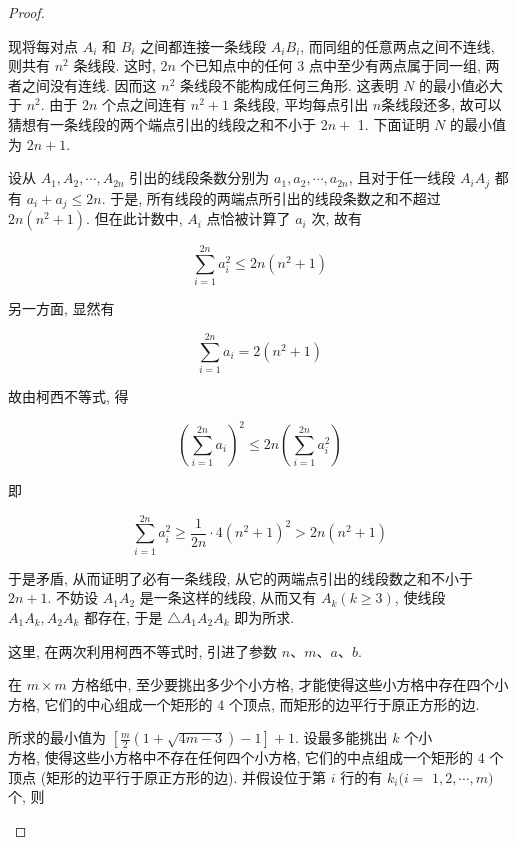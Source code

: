 \begin{proof}
\begin{example}
\begin{solution}
\begin{note}
\begin{solution}
	现将每对点 $A_{i}$ 和 $B_{i}$ 之间都连接一条线段 $A_{i} B_{i}$, 而同组的任意两点之间不连线, 则共有 $n^{2}$ 条线段. 这时, $2 n$ 个已知点中的任何 3 点中至少有两点属于同一组, 两者之间没有连线. 因而这 $n^{2}$ 条线段不能构成任何三角形. 这表明 $N$ 的最小值必大于 $n^{2}$. 由于 $2 n$ 个点之间连有 $n^{2}+1$ 条线段, 平均每点引出 $n$条线段还多, 故可以猜想有一条线段的两个端点引出的线段之和不小于 $2 n+$ 1. 下面证明 $N$ 的最小值为 $2 n+1$.
	
	设从 $A_{1}, A_{2}, \cdots, A_{2 n}$ 引出的线段条数分别为 $a_{1}, a_{2}, \cdots, a_{2 n}$, 且对于任一线段 $A_{i} A_{j}$ 都有 $a_{i}+a_{j} \leqslant 2 n$. 于是, 所有线段的两端点所引出的线段条数之和不超过 $2 n\left(n^{2}+1\right)$. 但在此计数中, $A_{i}$ 点恰被计算了 $a_{i}$ 次, 故有
	
	$$
	\sum_{i=1}^{2 n} a_{i}^{2} \leqslant 2 n\left(n^{2}+1\right)
	$$
	
	另一方面, 显然有
	
	$$
	\sum_{i=1}^{2 n} a_{i}=2\left(n^{2}+1\right)
	$$
	
	故由柯西不等式, 得
	
	$$
	\left(\sum_{i=1}^{2 n} a_{i}\right)^{2} \leqslant 2 n\left(\sum_{i=1}^{2 n} a_{i}^{2}\right)
	$$
	
	即
	
	$$
	\sum_{i=1}^{2 n} a_{i}^{2} \geqslant \frac{1}{2 n} \cdot 4\left(n^{2}+1\right)^{2}>2 n\left(n^{2}+1\right)
	$$
	
	于是矛盾, 从而证明了必有一条线段, 从它的两端点引出的线段数之和不小于 $2 n+1$. 不妨设 $A_{1} A_{2}$ 是一条这样的线段, 从而又有 $A_{k}(k \geqslant 3)$, 使线段 $A_{1} A_{k}, A_{2} A_{k}$ 都存在, 于是 $\triangle A_{1} A_{2} A_{k}$ 即为所求.
\end{solution}
\begin{note}
	这里, 在两次利用柯西不等式时, 引进了参数 $n 、 m 、 a 、 b$.
\end{note}

\begin{example}
	在 $m \times m$ 方格纸中, 至少要挑出多少个小方格, 才能使得这些小方格中存在四个小方格, 它们的中心组成一个矩形的 4 个顶点, 而矩形的边平行于原正方形的边.
\end{example}
\begin{solution}
	所求的最小值为 $\left[\frac{m}{2}(1+\sqrt{4 m-3})-1\right]+1$. 设最多能挑出 $k$ 个小\\
	方格, 使得这些小方格中不存在任何四个小方格, 它们的中点组成一个矩形的 4 个顶点 (矩形的边平行于原正方形的边). 并假设位于第 $i$ 行的有 $k_{i}(i=$ $1,2, \cdots, m)$ 个, 则
	

\end{solution}
\end{note}
\end{solution}
\end{example}
\end{proof}
